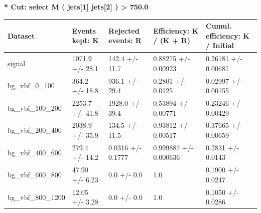 \documentclass[a4paper, 10pt]{article}
\begin{document}
\textbf{* Cut: select M ( jets[1] jets[2] ) > 750.0}\\
   \begin{table}[H]
  \begin{center}
    \begin{tabular}{|m{20.0mm}|m{27.0mm}|m{27.0mm}|m{33.0mm}|m{32.0mm}|}
      \hline
      {\cellcolor{yellow}         Dataset}& {\cellcolor{yellow}         Events kept:
          K}& {\cellcolor{yellow}         Rejected events:
          R}& {\cellcolor{yellow}         Efficiency:
          K /\- (K + R)}& {\cellcolor{yellow}         Cumul. efficiency:
          K /\- Initial}\\
      \hline
      {\cellcolor{white}         signal}& {\cellcolor{white}         1071.9 +/\-- 28.1}& {\cellcolor{white}         142.4 +/\-- 11.7}& {\cellcolor{white}         0.88275 +/\-- 0.00923}& {\cellcolor{white}         0.26181 +/\-- 0.00687}\\
      \hline
      {\cellcolor{white}         bg\_vbf\_0\_100}& {\cellcolor{white}         364.2 +/\-- 18.8}& {\cellcolor{white}         936.1 +/\-- 29.4}& {\cellcolor{white}         0.2801 +/\-- 0.0125}& {\cellcolor{white}         0.02997 +/\-- 0.00155}\\
      \hline
      {\cellcolor{white}         bg\_vbf\_100\_200}& {\cellcolor{white}         2253.7 +/\-- 41.8}& {\cellcolor{white}         1928.0 +/\-- 39.4}& {\cellcolor{white}         0.53894 +/\-- 0.00771}& {\cellcolor{white}         0.23246 +/\-- 0.00429}\\
      \hline
      {\cellcolor{white}         bg\_vbf\_200\_400}& {\cellcolor{white}         2038.9 +/\-- 35.9}& {\cellcolor{white}         134.5 +/\-- 11.5}& {\cellcolor{white}         0.93812 +/\-- 0.00517}& {\cellcolor{white}         0.37665 +/\-- 0.00659}\\
      \hline
      {\cellcolor{white}         bg\_vbf\_400\_600}& {\cellcolor{white}         279.4 +/\-- 14.2}& {\cellcolor{white}         0.0316 +/\-- 0.1777}& {\cellcolor{white}         0.999887 +/\-- 0.000636}& {\cellcolor{white}         0.2831 +/\-- 0.0143}\\
      \hline
      {\cellcolor{white}         bg\_vbf\_600\_800}& {\cellcolor{white}         47.90 +/\-- 6.23}& {\cellcolor{white}         0.0 +/\-- 0.0}& {\cellcolor{white}         1.0}& {\cellcolor{white}         0.1900 +/\-- 0.0247}\\
      \hline
      {\cellcolor{white}         bg\_vbf\_800\_1200}& {\cellcolor{white}         12.05 +/\-- 3.28}& {\cellcolor{white}         0.0 +/\-- 0.0}& {\cellcolor{white}         1.0}& {\cellcolor{white}         0.1050 +/\-- 0.0286}\\

\end{tabular}
\end{center}
\end{table}
\end{document}
